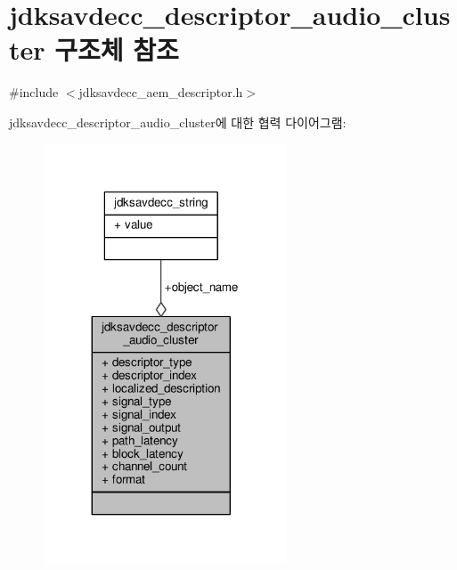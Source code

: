 \hypertarget{structjdksavdecc__descriptor__audio__cluster}{}\section{jdksavdecc\+\_\+descriptor\+\_\+audio\+\_\+cluster 구조체 참조}
\label{structjdksavdecc__descriptor__audio__cluster}


{\ttfamily \#include $<$jdksavdecc\+\_\+aem\+\_\+descriptor.\+h$>$}



jdksavdecc\+\_\+descriptor\+\_\+audio\+\_\+cluster에 대한 협력 다이어그램\+:
\nopagebreak
\begin{figure}[H]
\begin{center}
\leavevmode
\includegraphics[width=203pt]{structjdksavdecc__descriptor__audio__cluster__coll__graph}
\end{center}
\end{figure}
